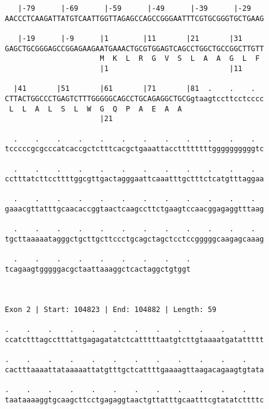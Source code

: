 \documentclass{article}
\begin{document}
\begin{Verbatim}
   |-79      |-69      |-59      |-49      |-39      |-29   
AACCCTCAAGATTATGTCAATTGGTTAGAGCCAGCCGGGAATTTCGTGCGGGTGCTGAAG
                                                            
   |-19      |-9      |1        |11       |21       |31     
GAGCTGCGGGAGCCGGAGAAGAATGAAACTGCGTGGAGTCAGCCTGGCTGCCGGCTTGTT
                      M  K  L  R  G  V  S  L  A  A  G  L  F 
                      |1                            |11     
  
  |41       |51       |61       |71       |81  .    .    .  
CTTACTGGCCCTGAGTCTTTGGGGGCAGCCTGCAGAGGCTGCGgtaagtccttcctcccc
 L  L  A  L  S  L  W  G  Q  P  A  E  A  A                   
                      |21                                   
  
  .    .    .    .    .    .    .    .    .    .    .    .  
tcccccgcgcccatcaccgctctttcacgctgaaattaccttttttttggggggggggtc
                                                            
  .    .    .    .    .    .    .    .    .    .    .    .  
cctttatcttccttttggcgttgactagggaattcaaatttgctttctcatgtttaggaa
                                                            
  .    .    .    .    .    .    .    .    .    .    .    .  
gaaacgttatttgcaacaccggtaactcaagccttctgaagtccaacggagaggtttaag
                                                            
  .    .    .    .    .    .    .    .    .    .    .    .  
tgcttaaaaatagggctgcttgcttccctgcagctagctcctccgggggcaagagcaaag
                                                            
  .    .    .    .    .    .    .    .    .
tcagaagtgggggacgctaattaaaggctcactaggctgtggt
                                           
                                           
 
Exon 2 | Start: 104823 | End: 104882 | Length: 59
 
.    .    .    .    .    .    .    .    .    .    .    .    
ccatctttagcctttattgagagatatctcatttttaatgtcttgtaaaatgatattttt
                                                            
.    .    .    .    .    .    .    .    .    .    .    .    
cactttaaaattataaaaattatgtttgctcattttgaaaagttaagacagaagtgtata
                                                            
.    .    .    .    .    .    .    .    .    .    .    .    
taataaaaggtgcaagcttcctgagaggtaactgttatttgcaatttcgtatatcttttc
                                                            

\end{Verbatim}
\end{document}
